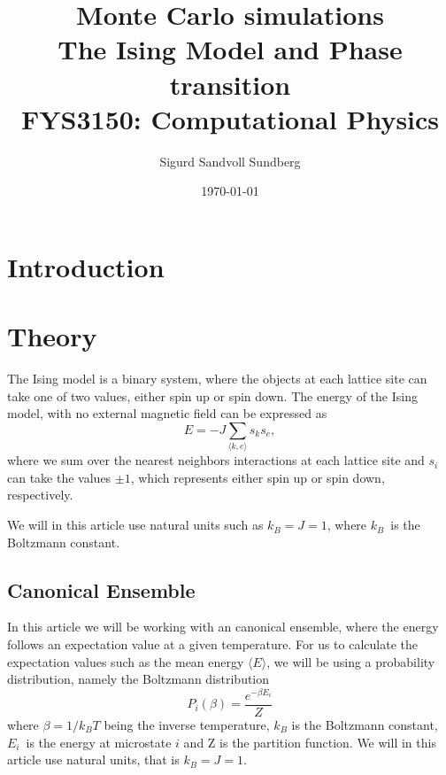 \documentclass[%
reprint,
nofootinbib,
amsmath,amssymb,
aps,
]{revtex4-1}
\begin{document}
	
\title{Monte Carlo simulations\\
	\normalsize{The Ising Model and Phase transition} \\
	\hrulefill\small{ FYS3150: Computational Physics }\hrulefill}

\author{Sigurd Sandvoll Sundberg}

%

\date{\today}

\begin{abstract}%

\end{abstract}

\maketitle 

\section{Introduction} %

\section{Theory} %
The Ising model is a binary system, where the objects at each lattice site can take one of two values, either spin up or spin down. 
The energy of the Ising model, with no external magnetic field can be expressed as 
\begin{equation}
	E = -J\sum_{\langle k,e \rangle} s_ks_e,
\end{equation}
where we sum over the nearest neighbors interactions at each lattice site and $s_i$ can take the values $\pm 1$, which represents either spin up or spin down, respectively. 

We will in this article use natural units such as $k_B = J = 1$, where $k_B$ is the Boltzmann constant. 
\subsection{Canonical Ensemble} %
In this article we will be working with an canonical ensemble, where the energy follows an expectation value at a given temperature. For us to calculate the expectation values such as the mean energy $\langle E \rangle$, we will be using a probability distribution, namely the Boltzmann distribution
\begin{equation}\label{eq:boltz}
	P_i(\beta) = \frac{e^{-\beta E_i}}{Z}
\end{equation}
where $\beta = 1/k_BT$ being the inverse temperature, $k_B$ is the Boltzmann constant, $E_i$ is the energy at microstate $i$ and Z is the partition function. We will in this article use natural units, that is $k_B = J = 1$. 
\end{document}
